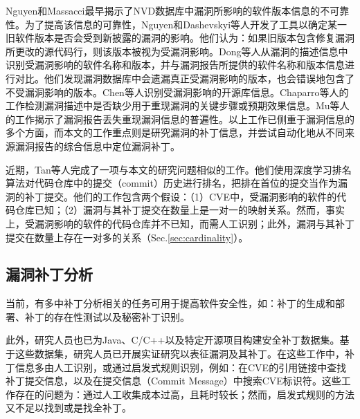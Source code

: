 Nguyen和Massacci\cite{nguyen2013reliability}最早揭示了NVD数据库中漏洞所影响的软件版本信息的不可靠性。为了提高该信息的可靠性，Nguyen\cite{nguyen2016automatic}和Dashevskyi等人\cite{dashevskyi2018screening}开发了工具以确定某一旧软件版本是否会受到新披露的漏洞的影响。他们认为：如果旧版本包含修复漏洞所更改的源代码行，则该版本被视为受漏洞影响。Dong等人\cite{dong2019towards}从漏洞的描述信息中识别受漏洞影响的软件名称和版本，并与漏洞报告所提供的软件名称和版本信息进行对比。他们发现漏洞数据库中会遗漏真正受漏洞影响的版本，也会错误地包含了不受漏洞影响的版本。Chen等人\cite{chen2020automated}识别受漏洞影响的开源库信息。Chaparro等人的工作\cite{chaparro2017detecting}检测漏洞描述中是否缺少用于重现漏洞的关键步骤或预期效果信息。Mu等人的工作\cite{mu2018understanding}揭示了漏洞报告丢失重现漏洞信息的普遍性。以上工作已侧重于漏洞信息的多个方面，而本文的工作重点则是研究漏洞的补丁信息，并尝试自动化地从不同来源漏洞报告的综合信息中定位漏洞补丁。

近期，Tan等人完成了一项与本文的研究问题相似的工作\cite{Tan2021locating}。他们使用深度学习排名算法对代码仓库中的提交（commit）历史进行排名，把排在首位的提交当作为漏洞的补丁提交。他们的工作包含两个假设：（1）CVE中，受漏洞影响的软件的代码仓库已知；（2）漏洞与其补丁提交在数量上是一对一的映射关系。然而，事实上，受漏洞影响的软件的代码仓库并不已知，而需人工识别；此外，漏洞与其补丁提交在数量上存在一对多的关系（Sec.\ref{sec:cardinality}）。


\subsection{漏洞补丁分析}
当前，有多中补丁分析相关的任务可用于提高软件安全性，如：补丁的生成和部署\cite{mulliner2013patchdroid,duan2019automating,xu2020automatic}、补丁的存在性测试\cite{zhang2018precise,jiang2020pdiff,dai2020bscout}以及秘密补丁识别\cite{xu2017spain,zhou2017automated,sabetta2018practical,chen2020machine}。

此外，研究人员也已为Java\cite{ponta2019manually}、C/C++\cite{fan2020ac}以及特定开源项目\cite{jimenez2018enabling}构建安全补丁数据集。基于这些数据集，研究人员已开展实证研究以表征漏洞及其补丁\cite{zaman2011security,li2017large,liu2020large,antal2020exploring}。在这些工作中，补丁信息多由人工识别\cite{xu2020automatic,jiang2020pdiff,dai2020bscout,xu2017spain,zhou2017automated,sabetta2018practical,chen2020machine,ponta2019manually,zaman2011security}，或通过启发式规则识别，例如：在CVE的引用链接中查找补丁提交信息\cite{duan2019automating,fan2020ac,jimenez2018enabling,li2017large,liu2020large}，以及在提交信息（Commit Message）中搜索CVE标识符\cite{fan2020ac, jimenez2018enabling, antal2020exploring}。这些工作存在的问题为：通过人工收集成本过高，且耗时较长；然而，启发式规则的方法又不足以找到或是找全补丁。


